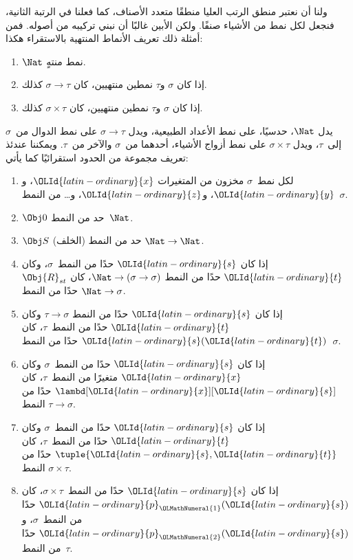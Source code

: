\documentclass[../../../include/open-logic-section]{subfiles}
\begin{document}
ولنا أن نعتبر منطق الرتب العليا منطقًا متعدد الأصناف، كما
فعلنا في الرتبة الثانية، فنجعل لكل نمط من الأشياء صنفًا.
ولكن الأبين غالبًا أن نبني تركيبه من أصوله. فمن أمثلة ذلك
تعريف الأنماط المنتهية بالاستقراء هكذا:
\begin{enumerate}
\item $\Nat$ نمط منتهٍ.
\item إذا كان $\sigma$ و$\tau$ نمطين منتهيين، كان $\sigma
  \to \tau$ كذلك.
\item إذا كان $\sigma$ و$\tau$ نمطين منتهيين، كان $\sigma \times
  \tau$ كذلك.
\end{enumerate}
يدل $\Nat$، حدسيًا، على نمط الأعداد الطبيعية، ويدل $\sigma \to
\tau$ على نمط الدوال من~$\sigma$ إلى~$\tau$، ويدل $\sigma \times
\tau$ على نمط أزواج الأشياء، أحدهما من~$\sigma$ والآخر من~$\tau$.
ويمكننا عندئذ تعريف مجموعة من الحدود استقرائيًا كما يأتي:
\begin{enumerate}
\item لكل نمط~$\sigma$ مخزون من المتغيرات $\OLId{latin-ordinary}{x}$، و$\OLId{latin-ordinary}{y}$، و$\OLId{latin-ordinary}{z}$، و\dots
  من النمط~$\sigma$.
\item $\Obj 0$ حد من النمط~$\Nat$.
\item $\Obj S$ (الخلف) حد من النمط $\Nat \to \Nat$.
\item إذا كان $\OLId{latin-ordinary}{s}$ حدًا من النمط~$\sigma$، وكان $\OLId{latin-ordinary}{t}$ حدًا من النمط
  $\Nat \to (\sigma \to \sigma)$، كان $\Obj{R}_{st}$ حدًا من النمط
  $\Nat \to \sigma$.
\item إذا كان $\OLId{latin-ordinary}{s}$ حدًا من النمط $\tau \to \sigma$ وكان $\OLId{latin-ordinary}{t}$ حدًا من
  النمط~$\tau$، كان $\OLId{latin-ordinary}{s}(\OLId{latin-ordinary}{t})$ حدًا من النمط~$\sigma$.
\item إذا كان $\OLId{latin-ordinary}{s}$ حدًا من النمط~$\sigma$ وكان $\OLId{latin-ordinary}{x}$ متغيرًا من
  النمط~$\tau$، كان $\lambd[\OLId{latin-ordinary}{x}][\OLId{latin-ordinary}{s}]$ حدًا من النمط $\tau \to \sigma$.
\item إذا كان $\OLId{latin-ordinary}{s}$ حدًا من النمط~$\sigma$ وكان $\OLId{latin-ordinary}{t}$ حدًا من
  النمط~$\tau$، كان $\tuple{\OLId{latin-ordinary}{s}, \OLId{latin-ordinary}{t}}$ حدًا من النمط $\sigma \times
  \tau$.
\item إذا كان $\OLId{latin-ordinary}{s}$ حدًا من النمط~$\sigma \times \tau$، كان $\OLId{latin-ordinary}{p}_\OLMathNumeral{1}(\OLId{latin-ordinary}{s})$
  حدًا من النمط~$\sigma$، و$\OLId{latin-ordinary}{p}_\OLMathNumeral{2}(\OLId{latin-ordinary}{s})$ حدًا من النمط~$\tau$.
\end{enumerate}
\end{document}
